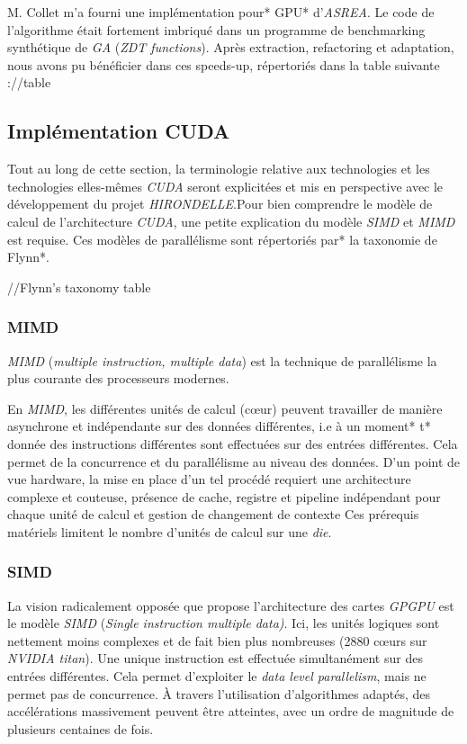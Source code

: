 \documentclass[french, 11pt]{memoir}
\begin{document}
M. Collet m'a fourni une implémentation pour* GPU* d'\emph{ASREA}. Le
code de l'algorithme était fortement imbriqué dans un programme de
benchmarking synthétique de \emph{GA} (\emph{ZDT functions}). Après
extraction, refactoring et adaptation, nous avons pu bénéficier dans ces
speeds-up, répertoriés dans la table suivante ://table

\subsection{Implémentation CUDA}\label{impluxe9mentation-cuda}

Tout au long de cette section, la terminologie relative aux technologies
et les technologies elles-mêmes \emph{CUDA} seront explicitées et mis en
perspective avec le développement du projet \emph{HIRONDELLE}.Pour bien
comprendre le modèle de calcul de l'architecture \emph{CUDA}, une petite
explication du modèle \emph{SIMD} et \emph{MIMD} est requise. Ces
modèles de parallélisme sont répertoriés par* la taxonomie de Flynn*.

//Flynn's taxonomy table

\subsubsection{MIMD}\label{mimd}

\emph{MIMD} (\emph{multiple instruction, multiple data}) est la
technique de parallélisme la plus courante des processeurs modernes.

En \emph{MIMD}, les différentes unités de calcul (cœur) peuvent
travailler de manière asynchrone et indépendante sur des données
différentes, i.e à un moment* t* donnée des instructions différentes
sont effectuées sur des entrées différentes. Cela permet de la
concurrence et du parallélisme au niveau des données. D'un point de vue
hardware, la mise en place d'un tel procédé requiert une architecture
complexe et couteuse, présence de cache, registre et pipeline
indépendant pour chaque unité de calcul et gestion de changement de
contexte Ces prérequis matériels limitent le nombre d'unités de calcul
sur une \emph{die}.

\subsubsection{SIMD}\label{simd}

La vision radicalement opposée que propose l'architecture des cartes
\emph{GPGPU} est le modèle \emph{SIMD} (\emph{Single instruction
	multiple data)}. Ici, les unités logiques sont nettement moins complexes
et de fait bien plus nombreuses (2880 cœurs sur \emph{NVIDIA titan}).
Une unique instruction est effectuée simultanément sur des entrées
différentes. Cela permet d'exploiter le \emph{data level parallelism},
mais ne permet pas de concurrence. À travers l'utilisation d'algorithmes
adaptés, des accélérations massivement peuvent être atteintes, avec un
ordre de magnitude de plusieurs centaines de fois.
\end{document}
